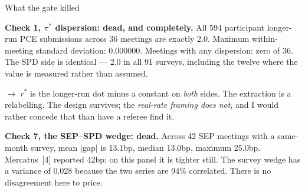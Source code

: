 \documentclass[aspectratio=169, 11pt]{beamer}
\newcommand{\rstar}{r^{*}}
\newcommand{\kills}{\textcolor{killred}{\textbf{dead}}}
\begin{document}
\begin{frame}{What the gate killed}

\textbf{Check 1, $\pi^{*}$ dispersion: \kills, and completely.} All 594
participant longer-run PCE submissions across 36 meetings are exactly 2.0.
Maximum within-meeting standard deviation: $0.000000$. Meetings with any
dispersion: zero of 36. The SPD side is identical --- 2.0 in all 91 surveys,
including the twelve where the value is measured rather than assumed.

\vspace{0.6em}

$\rightarrow$ $\rstar$ is the longer-run dot minus a constant on \emph{both}
sides. The extraction is a relabelling. The design survives; the
\emph{real-rate framing does not}, and I would rather concede that than have
a referee find it.

\vspace{0.9em}

\textbf{Check 7, the SEP--SPD wedge: \kills.} Across 42 SEP meetings with a
same-month survey, mean $|$gap$|$ is 13.1bp, median 13.0bp, maximum 25.0bp.
Mercatus~[4] reported 42bp; on this panel it is tighter still. The survey
wedge has a variance of 0.028 because the two series are 94\% correlated.
There is no disagreement here to price.

\end{frame}
\end{document}
